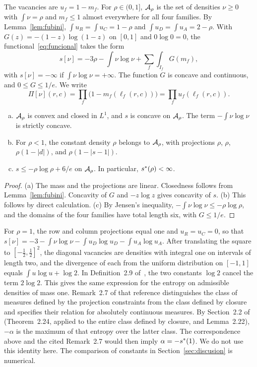 The vacancies are $u_f=1-m_f$. For $\rho\in(0,1]$, ${\mathcal{A}}_\rho$ is the set of densities $\nu\ge0$ with $\int\nu=\rho$ and $m_f\le1$
almost everywhere for all four families. By Lemma~\ref{lem:fubini}, $\int u_R=\int u_C=1-\rho$ and $\int u_D=\int u_A=2-\rho$. With
$G(z)=-(1-z)\log(1-z)$ on $[0,1]$ and $0\log0=0$, the functional~\eqref{eq:funcional} takes the form \[
 s[\nu]=-3\rho-\int\nu\log\nu+\sum_f\int_{I_f}G(m_f),
\] with $s[\nu]=-\infty$ if $\int\nu\log\nu=+\infty$. The function $G$ is concave and continuous, and $0\le G\le1/e$. We write \[
 \Pi[\nu](r,c)=\prod_f\bigl(1-m_f(\ell_f(r,c))\bigr)=\prod_fu_f(\ell_f(r,c)).
\]

\begin{lema}\label{lem:elementales} \begin{enumerate}[(a)] \item ${\mathcal{A}}_\rho$ is convex and closed in $L^1$, and
$s$ is concave on ${\mathcal{A}}_\rho$. The term $-\int\nu\log\nu$ is strictly concave. \item For $\rho<1$, the constant density $\rho$ belongs
to ${\mathcal{A}}_\rho$, with projections $\rho$, $\rho$, $\rho(1-|d|)$, and $\rho(1-|s-1|)$. \item $s\le-\rho\log\rho+6/e$ on ${\mathcal{A}}_\rho$. In
particular, $s^{*}(\rho)<\infty$. \end{enumerate} \end{lema}

\begin{proof} (a) The mass and the projections are linear. Closedness follows from Lemma~\ref{lem:fubini}. Concavity of $G$ and $-z\log
z$ gives concavity of $s$. (b) This follows by direct calculation. (c) By Jensen's inequality, $-\int\nu\log\nu\le-\rho\log\rho$, and
the domains of the four families have total length six, with $G\le1/e$. \end{proof}

\begin{observacion}\label{obs:simkin} For $\rho=1$, the row and column projections equal one and
$u_R=u_C=0$, so that $s[\nu]=-3-\int\nu\log\nu-\int u_D\log u_D-\int u_A\log u_A$. After translating the square to
$[-\frac12,\frac12]^2$, the diagonal vacancies are densities with integral one on intervals of length two, and the divergence of each
from the uniform distribution on $[-1,1]$ equals $\int u\log u+\log2$. In Definition~2.9 of~\cite{Simkin}, the two constants $\log2$
cancel the term $2\log2$. This gives the same expression for the entropy on admissible densities of mass one. Remark~2.7 of that
reference distinguishes the class of measures defined by the projection constraints from the class defined by closure and specifies
their relation for absolutely continuous measures. By Section~2.2 of~\cite{Simkin} (Theorem~2.24, applied to the entire class defined
by closure, and Lemma~2.22), $-\alpha$ is the maximum of that entropy over the latter class. The correspondence above and the cited
Remark~2.7 would then imply $\alpha=-s^{*}(1)$. We do not use this identity here. The comparison of constants in
Section~\ref{sec:discusion} is numerical. \end{observacion}

